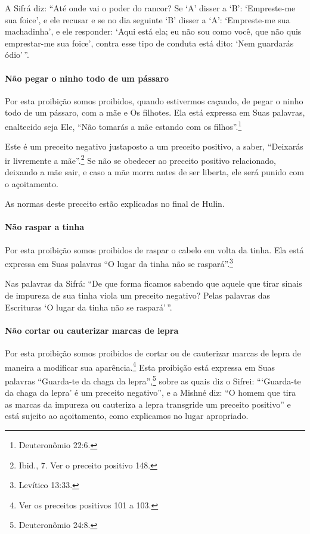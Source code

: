 A Sifrá diz: ``Até onde vai o poder do rancor? Se `A' disser a `B':
`Empreste-me sua foice', e ele recusar e se no dia seguinte `B' disser a
`A': `Empreste-me sua machadinha', e ele responder: `Aqui está ela; eu
não sou como você, que não quis emprestar-me sua foice', contra esse
tipo de conduta está dito: `Nem guardarás ódio'\,''.

\paragraph{Não pegar o ninho todo de um pássaro}

Por esta proibição somos proibidos, quando estivermos caçando, de pegar
o ninho todo de um pássaro, com a mãe e Os filhotes. Ela está expressa
em Suas palavras, enaltecido seja Ele, ``Não tomarás a mãe estando com
os filhos''.\footnote{Deuteronômio 22:6.}

Este é um preceito negativo justaposto a um preceito positivo, a saber,
``Deixarás ir livremente a mãe''.\footnote{Ibid., 7. Ver o preceito positivo 148.} Se não
se obedecer ao preceito positivo relacionado, deixando a mãe sair, e caso a mãe morra antes de ser liberta, ele será punido com o açoitamento.

As normas deste preceito estão explicadas no final de Hulin.

\paragraph{Não raspar a tinha}

Por esta proibição somos proibidos de raspar o cabelo em volta da tinha.
Ela está expressa em Suas palavras ``O lugar da tinha não se raspará''.\footnote{Levítico 13:33.}

Nas palavras da Sifrá: ``De que forma ficamos sabendo que aquele que
tirar sinais de impureza de sua tinha viola um preceito negativo? Pelas
palavras das Escrituras `O lugar da tinha não se raspará'\,''.

\paragraph{Não cortar ou cauterizar marcas de lepra}

Por esta proibição somos proibidos de cortar ou de cauterizar marcas de lepra de maneira a modificar sua aparência.\footnote{Ver os preceitos positivos 101 a 103.}
Esta proibição está expressa em Suas palavras ``Guarda-te da chaga da
lepra'',\footnote{Deuteronômio 24:8.} sobre as quais diz o Sifrei: ```Guarda-te
da chaga da lepra' é um preceito negativo'', e a Mishné diz: ``O homem
que tira as marcas da impureza ou cauteriza a lepra transgride um
preceito positivo'' e está sujeito ao açoitamento, como explicamos no
lugar apropriado.

